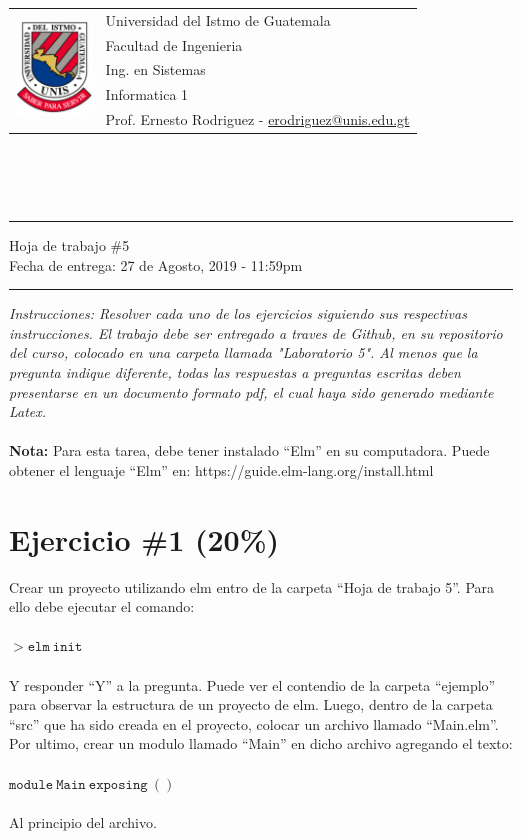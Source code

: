 \documentclass{article}
\newcommand{\horrule}[1]{\rule{\linewidth}{#1}}
\begin{document}
\begin{tabular}{l l}
\multirow{5}{*}{\includegraphics[width=2cm]{../../recursos/logo.png}}
 & Universidad del Istmo de Guatemala \\
 & Facultad de Ingenieria \\
 & Ing. en Sistemas \\
 & Informatica 1 \\
 & Prof. Ernesto Rodriguez - \href{mailto:erodriguez@unis.edu.gt}{erodriguez@unis.edu.gt} \\
\end{tabular}
\\\\\\

\begin{center}
        \horrule{0.5pt}
        \huge{Hoja de trabajo \#5} \\
        \large{Fecha de entrega: 27 de Agosto, 2019 - 11:59pm} \\
        \horrule{1pt}
\end{center}

\emph{Instrucciones: Resolver cada uno de los ejercicios siguiendo sus respectivas
instrucciones. El trabajo debe ser entregado a traves de Github, en su repositorio del curso, colocado en una
carpeta llamada "Laboratorio 5". Al menos que la pregunta indique diferente, todas las
respuestas a preguntas escritas deben presentarse en un documento formato pdf, el cual
haya sido generado mediante Latex. }\\\\

{\bf Nota: } Para esta tarea, debe tener instalado ``Elm'' en su computadora. Puede obtener
el lenguaje ``Elm'' en: https://guide.elm-lang.org/install.html

\section*{Ejercicio \#1 (20\%)}
Crear un proyecto utilizando elm entro de la carpeta ``Hoja de trabajo 5''.
Para ello debe ejecutar el comando:\\\\
$>\mathtt{elm\ init}$\\\\
Y responder ``Y'' a la pregunta. Puede ver el contendio de la carpeta ``ejemplo''
para observar la estructura de un proyecto de elm. Luego, dentro de la carpeta
``src'' que ha sido creada en el proyecto, colocar un archivo llamado ``Main.elm''.
Por ultimo, crear un modulo llamado ``Main'' en dicho archivo agregando el texto:\\\\
$\mathtt{module\ Main\ exposing\ ()}$\\\\
Al principio del archivo.
\end{document}
